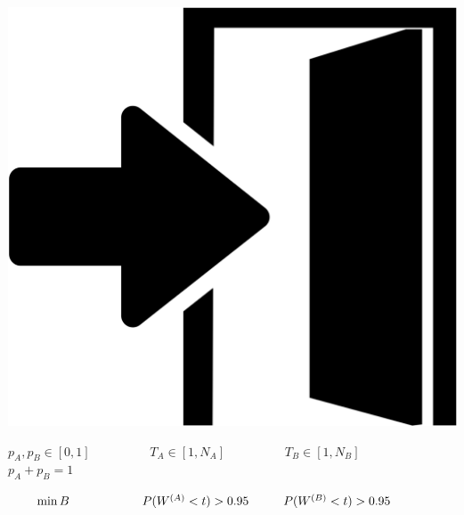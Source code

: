 \begin{frame}
    \includegraphics[scale=0.04]{Bin/cartoon_pics/door.png}

    \(p_A, p_B \in [0, 1] \hspace{2cm} T_A \in [1, N_A] 
    \hspace{2cm} T_B \in [1, N_B]\)    
    \(p_A + p_B = 1 \hspace{8cm}\)
    
    \vspace{1cm}
    \small
    \(
        \qquad \min B \hspace{2.1cm} P(W^{(A)} < t) > 0.95 
        \hspace{1cm} P(W^{(B)} < t) > 0.95
    \)
\end{frame}


